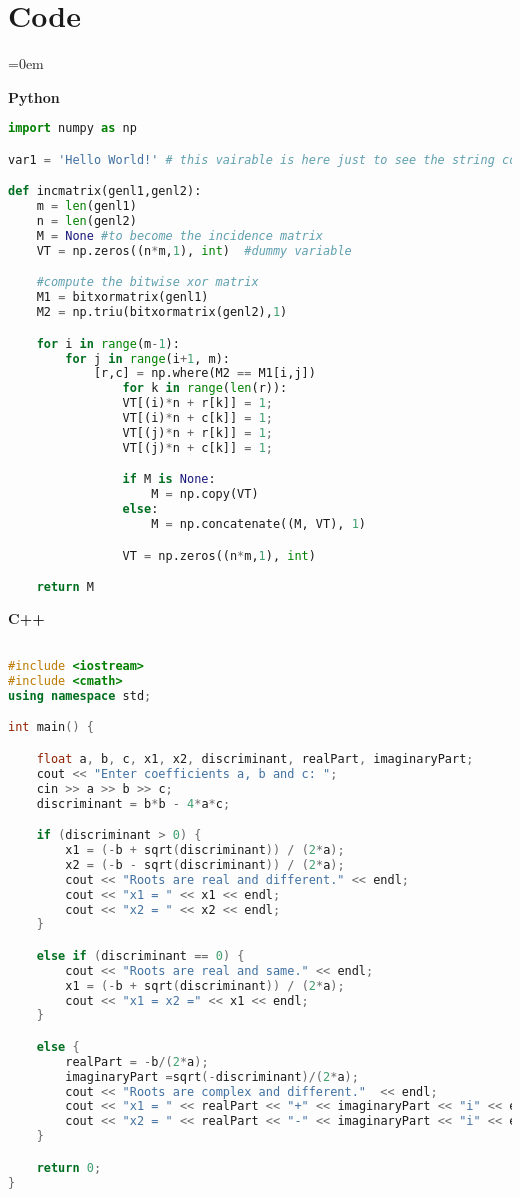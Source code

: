 


\section{Code}
\label{sec:code}
\parindent=0em

\textbf{Python}
\begin{lstlisting}[language=Python]
import numpy as np

var1 = 'Hello World!' # this vairable is here just to see the string color

def incmatrix(genl1,genl2):
	m = len(genl1)
	n = len(genl2)
	M = None #to become the incidence matrix
	VT = np.zeros((n*m,1), int)  #dummy variable

	#compute the bitwise xor matrix
	M1 = bitxormatrix(genl1)
	M2 = np.triu(bitxormatrix(genl2),1) 

	for i in range(m-1):
		for j in range(i+1, m):
			[r,c] = np.where(M2 == M1[i,j])
				for k in range(len(r)):
				VT[(i)*n + r[k]] = 1;
				VT[(i)*n + c[k]] = 1;
				VT[(j)*n + r[k]] = 1;
				VT[(j)*n + c[k]] = 1;

				if M is None:
					M = np.copy(VT)
				else:
					M = np.concatenate((M, VT), 1)

				VT = np.zeros((n*m,1), int)

	return M
\end{lstlisting}

\lipsum[1]

\textbf{C++}
\begin{lstlisting}[language=C++]

#include <iostream>
#include <cmath>
using namespace std;

int main() {

	float a, b, c, x1, x2, discriminant, realPart, imaginaryPart;
	cout << "Enter coefficients a, b and c: ";
	cin >> a >> b >> c;
	discriminant = b*b - 4*a*c;

	if (discriminant > 0) {
		x1 = (-b + sqrt(discriminant)) / (2*a);
		x2 = (-b - sqrt(discriminant)) / (2*a);
		cout << "Roots are real and different." << endl;
		cout << "x1 = " << x1 << endl;
		cout << "x2 = " << x2 << endl;
	}

	else if (discriminant == 0) {
		cout << "Roots are real and same." << endl;
		x1 = (-b + sqrt(discriminant)) / (2*a);
		cout << "x1 = x2 =" << x1 << endl;
	}

	else {
		realPart = -b/(2*a);
		imaginaryPart =sqrt(-discriminant)/(2*a);
		cout << "Roots are complex and different."  << endl;
		cout << "x1 = " << realPart << "+" << imaginaryPart << "i" << endl;
		cout << "x2 = " << realPart << "-" << imaginaryPart << "i" << endl;
	}

	return 0;
}


\end{lstlisting}


\lipsum[1]


\sectionend

